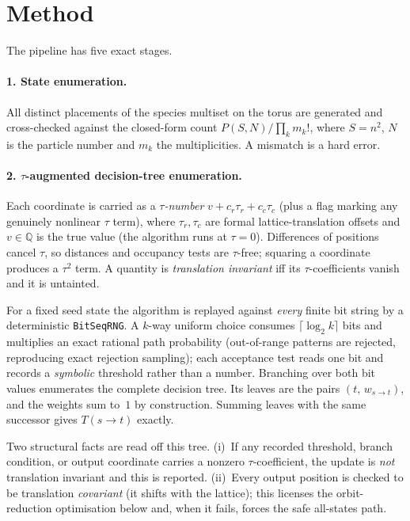 \documentclass[10pt]{article}
\newcommand{\code}[1]{\texttt{\small #1}}
\newcommand{\Q}{\mathbb{Q}}
\begin{document}
\section{Method}
The pipeline has five exact stages.

\paragraph{1. State enumeration.}
All distinct placements of the species multiset on the torus are generated and
cross-checked against the closed-form count $P(S,N)/\prod_k m_k!$, where $S=n^2$,
$N$ is the particle number and $m_k$ the multiplicities. A mismatch is a hard
error.

\paragraph{2. $\tau$-augmented decision-tree enumeration.}
Each coordinate is carried as a \emph{$\tau$-number}
$v+c_r\tau_r+c_c\tau_c$ (plus a flag marking any genuinely nonlinear $\tau$ term),
where $\tau_r,\tau_c$ are formal lattice-translation offsets and $v\in\Q$ is the
true value (the algorithm runs at $\tau=0$). Differences of positions cancel
$\tau$, so distances and occupancy tests are $\tau$-free; squaring a coordinate
produces a $\tau^2$ term. A quantity is \emph{translation invariant} iff its
$\tau$-coefficients vanish and it is untainted.

For a fixed seed state the algorithm is replayed against \emph{every} finite bit
string by a deterministic \code{BitSeqRNG}. A $k$-way uniform choice consumes
$\lceil\log_2 k\rceil$ bits and multiplies an exact rational path probability
(out-of-range patterns are rejected, reproducing exact rejection sampling); each
acceptance test reads one bit and records a \emph{symbolic} threshold rather than
a number. Branching over both bit values enumerates the complete decision tree.
Its leaves are the pairs $(t,\,w_{s\to t})$, and the weights sum to~$1$ by
construction. Summing leaves with the same successor gives $T(s\to t)$ exactly.

Two structural facts are read off this tree. (i)~If any recorded threshold,
branch condition, or output coordinate carries a nonzero $\tau$-coefficient, the
update is \emph{not} translation invariant and this is reported. (ii)~Every
output position is checked to be translation \emph{covariant} (it shifts with the
lattice); this licenses the orbit-reduction optimisation below and, when it
fails, forces the safe all-states path.
\end{document}
